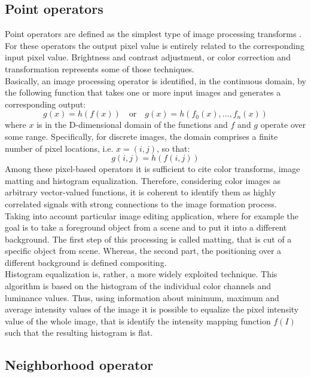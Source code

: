 \subsection{Point operators}
\label{subsection:point-operators}

Point operators are defined as the simplest type of image processing transforms \cite{Szeliski2011}.
For these operators the output pixel value is entirely related to the corresponding input pixel value.
Brightness and contrast adjustment, or color correction and transformation represents some of those techniques.\\
Basically, an image processing operator is identified, in the continuous domain, by the following function that takes one or more input images and generates a corresponding output:
\begin{equation}
 \label{eqn:img-operator}
 g(x) = h(f(x)) \quad 	\mbox{or} \quad g(x) = h(f_0(x), ..., f_n(x))
\end{equation}
where $x$ is in the D-dimensional domain of the functions and $f$ and $g$ operate over some range.
Specifically, for discrete images, the domain comprises a finite number of pixel locations, i.e. $x = (i, j)$, so that:
\begin{equation}
	g(i, j) = h(f(i,j))
\end{equation}
Among these pixel-based operators it is sufficient to cite color transforms, image matting and histogram equalization. 
Therefore, considering color images as arbitrary vector-valued functions, it is coherent to identify them as highly correlated signals with strong connections to the image formation process. \\
Taking into account particular image editing application, where for example the goal is to take a foreground object from a scene and to put it into a different background.
The first step of this processing is called matting, that is cut of a specific object from scene. 
Whereas, the second part, the positioning over a different background is defined compositing.\\
Histogram equalization is, rather, a more widely exploited technique. 
This algorithm is based on the histogram of the individual color channels and luminance values.
Thus, using information about minimum, maximum and average intensity values of the image it is possible to equalize the pixel intensity value of the whole image, that is identify the intensity mapping function $f(I)$ such that the resulting histogram is flat. 

\subsection{Neighborhood operator}
\label{subsection:neighbor-operator}

